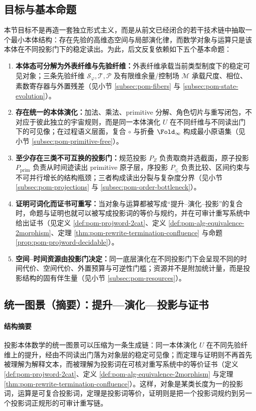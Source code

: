 \subsection{目标与基本命题}\label{subsec:pom-goal}
本节目标不是再造一套独立形式主义，而是从前文已经闭合的若干技术链中抽取一个最小本体结构：存在先验的高维态空间与局部演化律，而数学对象与运算只是该本体在不同投影门下的稳定读出。为此，后文反复依赖如下五个基本命题：
\begin{enumerate}
  \item \textbf{本体态可分解为外表纤维与先验纤维：}外表纤维承载当前类型制度下的稳定可见对象；三条先验纤维 $\mathcal S_\varphi,\mathcal T,\mathcal P$ 及有限维余量/控制场 $\mathcal M$ 承载尺度、相位、素数寄存器与外置残差（见小节 \ref{subsec:pom-fibers} 与 \ref{subsec:pom-state-evolution}）。
  \item \textbf{存在统一的本体演化：}加法、乘法、primitive 分解、角色切片与重写闭包，不对应于彼此独立的宇宙规则，而是同一本体演化 \(U\) 在不同纤维与不同读出门下的可见像；在过程语义层面，复合 $\circ$ 与折叠 $\Fold_\infty$ 构成最小原语集（见小节 \ref{subsec:pom-primitive-free}）。
  \item \textbf{至少存在三类不可互换的投影门：}规范投影 $P_Z$ 负责取商并选截面，原子投影 $P_{\mathrm{prim}}$ 负责从时间迹读出 primitive 原子层，序投影 $P_{\le}$ 负责比较、区间约束与不可并行增长的结构瓶颈；三者构成读出分裂与复杂度分界（见小节 \ref{subsec:pom-projections} 与 \ref{subsec:pom-order-bottleneck}）。
  \item \textbf{证明可词化而证书可重写：}当对象与运算都被写成“提升--演化--投影”的复合时，命题与证明也就可以被写成投影词的等价与规约，并在可审计重写系统中给出证书（见定义 \ref{def:pom-projword-2cat}、定义 \ref{def:pom-alg-equivalence-2morphism}、定理 \ref{thm:pom-rewrite-termination-confluence} 与命题 \ref{prop:pom-projword-decidable}）。
  \item \textbf{空间--时间资源由投影门决定：}同一底层演化在不同投影门下会呈现不同的时间代价、空间代价、外置预算与可逆性门槛；资源并不是附加统计量，而是投影结构的固有伴生量（见小节 \ref{subsec:pom-resources}）。
\end{enumerate}

\subsection{统一图景（摘要）：提升—演化—投影与证书}\label{subsec:pom-unified-picture}
\paragraph{结构摘要}
投影本体数学的统一图景可以压缩为一条生成链：同一本体演化 \(U\) 在不同先验纤维上的提升，经由不同读出门落为对象层的稳定可见像；而定理与证明则不再首先被理解为解释文本，而被理解为投影词在可核对重写系统中的等价证书（定义 \ref{def:pom-projword-2cat}、定义 \ref{def:pom-alg-equivalence-2morphism} 与定理 \ref{thm:pom-rewrite-termination-confluence}）。这样，对象是某类长度为一的投影词，运算是可复合投影词，定理是投影词等价，证明则是把一个投影词规约到另一个投影词正规形的可审计重写链。

